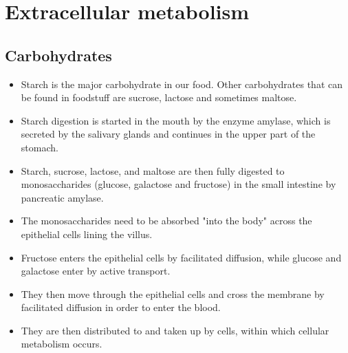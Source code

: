 \documentclass[11pt]{article}
\begin{document}
\newpage

\section{Extracellular metabolism}
\label{sec:orgff0db21}

\subsection{Carbohydrates}
\label{sec:orgf2592c5}
\begin{itemize}
\item Starch is the major carbohydrate in our food. Other carbohydrates that can be found in foodstuff are sucrose, lactose and sometimes maltose.
\item Starch digestion is started in the mouth by the enzyme amylase, which is secreted by the salivary glands and continues in the upper part of the stomach.
\item Starch, sucrose, lactose, and maltose are then fully digested to monosaccharides (glucose, galactose and fructose) in the small intestine by pancreatic amylase.
\item The monosaccharides need to be absorbed "into the body" across the epithelial cells lining the villus.
\item Fructose enters the epithelial cells by facilitated diffusion, while glucose and galactose enter by active transport.
\item They then move through the epithelial cells and cross the membrane by facilitated diffusion in order to enter the blood.
\item They are then distributed to and taken up by cells, within which cellular metabolism occurs.
\end{itemize}

\newpage
\end{document}
